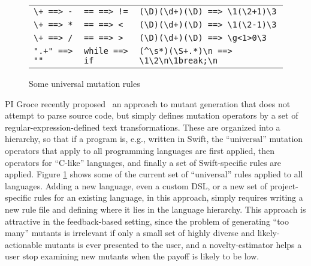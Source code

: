 \begin{figure}
\begin{tabularx}{0.75\textwidth}{XXX}
\verb|\+ ==> -| & \verb|== ==> !=| & \verb|(\D)(\d+)(\D) ==> \1(\2+1)\3|\\
\verb|\+ ==> *| & \verb|== ==> <| & \verb|(\D)(\d+)(\D) ==> \1(\2-1)\3|\\
\verb|\+ ==> /| & \verb|== ==> >| & \verb|(\D)(\d+)(\D) ==> \g<1>0\3|\\
\verb|".+" ==> ""| & \verb|while ==> if| & \verb|(^\s*)(\S+.*)\n ==> \1\2\n\1break;\n|\\
\end{tabularx}
\caption{Some universal mutation rules}
\label{fig:rules}
\end{figure}

PI Groce recently proposed~\cite{regexpMut} an approach to mutant generation that does not attempt to parse source code, but simply defines mutation operators by a set of regular-expression-defined text transformations.  These are organized into a hierarchy, so that if a program is, e.g., written in Swift, the ``universal'' mutation operators that apply to all programming languages are first applied, then operators for ``C-like'' languages, and finally a set of Swift-specific rules are applied.  Figure \ref{fig:rules} shows some of the current set of ``universal'' rules applied to all languages.  Adding a new language, even a custom DSL, or a new set of project-specific rules for an existing language, in this approach, simply requires writing a new rule file and defining where it lies in the language hierarchy.  This approach is attractive in the feedback-based setting, since the problem of generating ``too many'' mutants is irrelevant if only a small set of highly diverse and likely-actionable mutants is ever presented to the user, and a novelty-estimator helps a user stop examining new mutants when the payoff is likely to be low.

